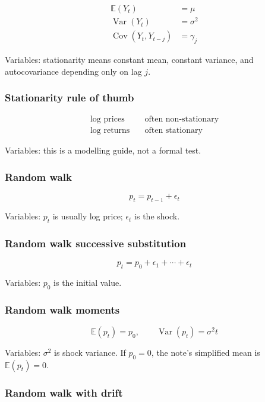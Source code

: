 \documentclass[
  8pt,
  twocolumn]{extarticle}
\begin{document}
\[
\begin{aligned}
\mathbb E(Y_t)&=\mu\\
\operatorname{Var}(Y_t)&=\sigma^2\\
\operatorname{Cov}(Y_t,Y_{t-j})&=\gamma_j
\end{aligned}
\]

Variables: stationarity means constant mean, constant variance, and
autocovariance depending only on lag \(j\).

\subsubsection{Stationarity rule of
thumb}\label{stationarity-rule-of-thumb}

\[
\begin{aligned}
\log\text{ prices}&\quad \text{often non-stationary}\\
\log\text{ returns}&\quad \text{often stationary}
\end{aligned}
\]

Variables: this is a modelling guide, not a formal test.

\subsubsection{Random walk}\label{random-walk}

\[
p_t=p_{t-1}+\epsilon_t
\]

Variables: \(p_t\) is usually log price; \(\epsilon_t\) is the shock.

\subsubsection{Random walk successive
substitution}\label{random-walk-successive-substitution}

\[
p_t=p_0+\epsilon_1+\cdots+\epsilon_t
\]

Variables: \(p_0\) is the initial value.

\subsubsection{Random walk moments}\label{random-walk-moments}

\[
\mathbb E(p_t)=p_0,\qquad \operatorname{Var}(p_t)=\sigma^2t
\]

Variables: \(\sigma^2\) is shock variance. If \(p_0=0\), the note's
simplified mean is \(\mathbb E(p_t)=0\).

\subsubsection{Random walk with drift}\label{random-walk-with-drift}
\end{document}

